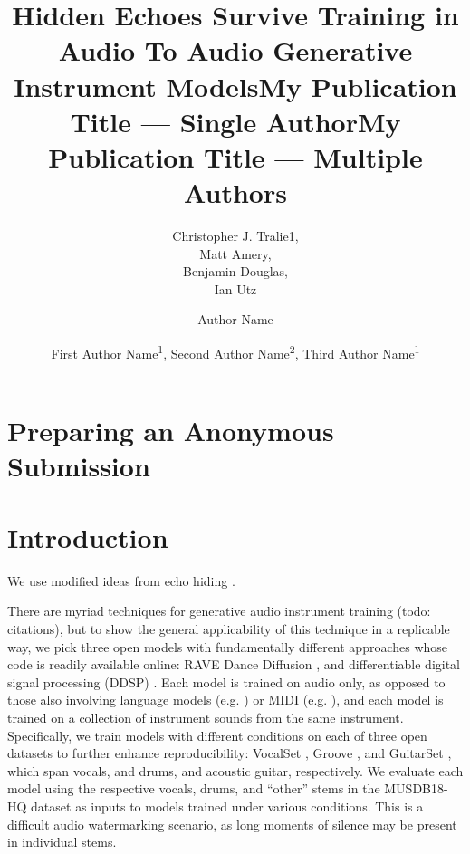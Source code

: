 \documentclass[letterpaper]{article} %
\title{Hidden Echoes Survive Training in Audio To Audio Generative Instrument Models}
\author{
    Christopher J. Tralie{\rm 1},\\
    Matt Amery,\\
    Benjamin Douglas,\\
    Ian Utz
}
\title{My Publication Title --- Single Author}
\author {
    Author Name
}
\title{My Publication Title --- Multiple Authors}
\author {
    First Author Name\textsuperscript{\rm 1},
    Second Author Name\textsuperscript{\rm 2},
    Third Author Name\textsuperscript{\rm 1}
}
\begin{document}
\maketitle

\begin{abstract}

\end{abstract}

%

\section{Preparing an Anonymous Submission}

\section{Introduction}

We use modified ideas from echo hiding \cite{gruhl1996echo}.

There are myriad techniques for generative audio instrument training (todo: citations), but to show the general applicability of this technique in a replicable way, we pick three open models with fundamentally different approaches whose code is readily available online: RAVE \cite{caillon2021rave} Dance Diffusion \cite{evans2022dancediffusion}, and differentiable digital signal processing (DDSP) \cite{engelddsp}.  Each model is trained on audio only, as opposed to those also involving language models (e.g. \cite{evans2024fast}) or MIDI (e.g. \cite{hawthornemulti}), and each model is trained on a collection of instrument sounds from the same instrument.  Specifically, we train models with different conditions on each of three open datasets to further enhance reproducibility: VocalSet \cite{wilkins2018vocalset}, Groove \cite{groove2019}, and GuitarSet \cite{xi2018guitarset}, which span vocals, and drums, and acoustic guitar, respectively.  We evaluate each model using the respective vocals, drums, and ``other'' stems in the MUSDB18-HQ dataset \cite{musdb18-hq} as inputs to models trained under various conditions.  This is a difficult audio watermarking scenario, as long moments of silence may be present in individual stems.
\end{document}
